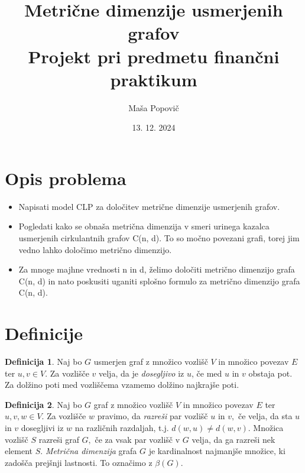 \documentclass[a4paper,12pt]{article}
\title{
  Metrične dimenzije usmerjenih grafov \\
  \large Projekt pri predmetu finančni praktikum\\}
\author{Maša Popovič}
\date{\small 13. 12. 2024}
\theoremstyle{definition}
\newtheorem{definicija}{Definicija}[section]
\theoremstyle{remark}
\theoremstyle{definition}
\begin{document}
\maketitle

\section*{Opis problema}

\begin{itemize}
    \item Napisati model CLP za določitev metrične dimenzije usmerjenih grafov.
    \item Pogledati kako se obnaša metrična dimenzija v smeri urinega kazalca usmerjenih cirkulantnih grafov C(n, d). To so močno povezani grafi, torej jim vedno lahko določimo metrično dimenzijo.
    \item Za mnoge majhne vrednosti n in d, želimo določiti metrično dimenzijo grafa C(n, d) in nato poskusiti uganiti splošno formulo za metrično dimenzijo grafa C(n, d).
\end{itemize}
 
\section*{Definicije}

\begin{definicija}
    Naj bo $G$ usmerjen graf z množico vozlišč $V$ in 
    množico povezav $E$ ter $u,v \in V.$ Za vozlišče $v$ velja, da je \textit{dosegljivo}
    iz $u$, če med $u$ in $v$ obstaja pot. Za dolžino poti med vozliščema vzamemo dolžino
    najkrajše poti.
    \\
\end{definicija}

\par

\begin{definicija}
    Naj bo $G$ graf z množico vozlišč $V$ in množico povezav $E$ ter $u,v,w \in V.$ Za vozlišče 
    $w$ pravimo, da \textit{razreši} par vozlišč $u$ in $v,$ če velja, da sta $u$ in $v$ dosegljivi
    iz $w$ na različnih razdaljah, t.j. $d(w,u) \neq d(w,v).$ Množica vozlišč $S$ razreši graf $G,$ če 
    za vsak par vozlišč v $G$ velja, da ga razreši nek element $S.$ \textit{Metrična dimenzija} grafa $G$
    je kardinalnost najmanjše množice, ki zadošča prejšnji lastnosti. To označimo z $\beta(G).$
    \\
\end{definicija}
\end{document}
